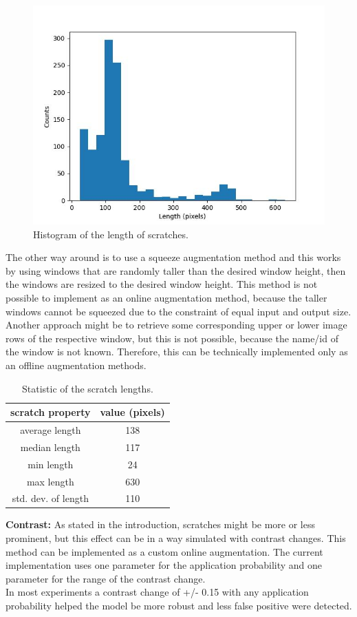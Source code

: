 \begin{figure}[!h]
\centering
\captionsetup{justification=centering,margin=2cm}
\includegraphics[width=0.6\columnwidth]{images/implementation/augmentations/scratch_length_histo}
\caption{Histogram of the length of scratches.}
\label{asdfsdf}
\end{figure}

The other way around is to use a squeeze augmentation method and this works by using windows that are randomly taller than the desired window height, then the windows are resized to the desired window height. This method is not possible to implement as an online augmentation method, because the taller windows cannot be squeezed due to the constraint of equal input and output size. Another approach might be to retrieve some corresponding upper or lower image rows of the respective window, but this is not possible, because the name/id of the window is not known. Therefore, this can be technically implemented only as an offline augmentation methods. \\

\begin{table}[!h]
\centering
\begin{tabular}{ ||c|c||}
\hline
scratch property & value (pixels)\\ [0.5ex]
\hline\hline
average length & 138 \\
median length & 117 \\
min length & 24 \\
max length & 630 \\
std. dev. of length & 110 \\
\hline
\end{tabular}
\label{impl:scratch_prop}
\caption{Statistic of the scratch lengths.}
\end{table}


\textbf{Contrast:} As stated in the introduction, scratches might be more or less prominent, but this effect can be in a way simulated with contrast changes. This method can be implemented as a custom online augmentation. The current implementation uses one parameter for the application probability and one parameter for the range of the contrast change. \\
In most experiments a contrast change of +/- 0.15 with any application probability helped the model be more robust and less false positive were detected. \\

